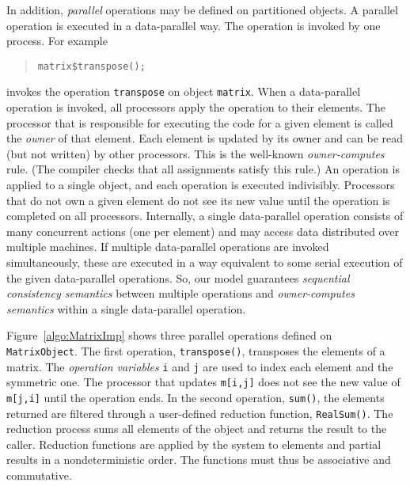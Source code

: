 \documentclass{acmtrans2e}
\begin{document}

In addition, {\em parallel} operations may be defined on partitioned
objects. A parallel operation is executed in a data-parallel way.
The operation is invoked by one process. For example
\begin{quote}
\begin{verbatim}
matrix$transpose();
\end{verbatim}
\end{quote}
invokes the operation \verb+transpose+ on object \verb+matrix+.
When a data-parallel operation is invoked,
all processors apply the operation to their elements. The processor that
is responsible for executing the code for a given element is called
the {\em owner} of that element.  Each element is updated by its owner
and can be read (but not written) by other processors. This is the
well-known {\em owner-computes} rule. (The compiler checks that all
assignments satisfy this rule.) An operation is applied to a single
object, and each operation is executed indivisibly. Processors
that do not own a given element do not see its new value until the
operation is completed on all processors.  Internally, a single
data-parallel operation consists of many concurrent actions (one per
element) and may access data distributed over multiple machines. If
multiple data-parallel operations are invoked simultaneously, these
are executed in a way equivalent to some serial execution of the
given data-parallel operations.  So, our model guarantees \emph{sequential
consistency semantics} between multiple operations and \emph{owner-computes
semantics} within a single data-parallel operation.

Figure~\ref{algo:MatrixImp} shows three parallel
operations defined on \verb+MatrixObject+.  The first operation,
\verb+transpose()+, transposes the elements of a matrix. The
\emph{operation variables} \verb+i+ and \verb+j+ are used to index
each element and the symmetric one. The processor that updates
\verb+m[i,j]+ does not see the new value of \verb+m[j,i]+ until the
operation ends.  In the second operation, \verb+sum()+, the elements
returned are filtered through a user-defined reduction function,
\verb+RealSum()+.  The reduction process sums all elements of the
object and returns the result to the caller.  Reduction functions are
applied by the system to elements and partial results in a
nondeterministic order.
The functions must thus be associative and commutative.
\end{document}
